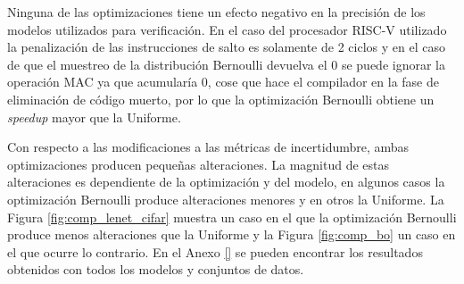 Ninguna de las optimizaciones tiene un efecto negativo en la precisión de los modelos utilizados para verificación. En el caso del procesador RISC-V utilizado la penalización de las instrucciones de salto es solamente de 2 ciclos y en el caso de que el muestreo de la distribución Bernoulli devuelva el 0 se puede ignorar la operación MAC ya que acumularía 0, cose que hace el compilador en la fase de eliminación de código muerto, por lo que la optimización Bernoulli obtiene un \textit{speedup} mayor que la Uniforme.

Con respecto a las modificaciones a las métricas de incertidumbre, ambas optimizaciones producen pequeñas alteraciones. La magnitud de estas alteraciones es dependiente de la optimización y del modelo, en algunos casos la optimización Bernoulli produce alteraciones menores y en otros la Uniforme. La Figura \ref{fig:comp_lenet_cifar} muestra un caso en el que la optimización Bernoulli produce menos alteraciones que la Uniforme y la Figura \ref{fig:comp_bo} un caso en el que ocurre lo contrario. En el Anexo \ref{} se pueden encontrar los resultados obtenidos con todos los modelos y conjuntos de datos. \todo

